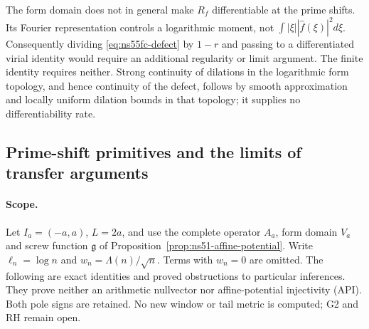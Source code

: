 \documentclass[11pt]{article}
\theoremstyle{remark}
\begin{document}
The form domain does not in general make $R_f$ differentiable at the
prime shifts. Its Fourier representation controls a logarithmic moment,
not $\int|\xi||\widehat f(\xi)|^2d\xi$. Consequently dividing
\eqref{eq:ns55fc-defect} by $1-r$ and passing to a differentiated
virial identity would require an additional regularity or limit
argument. The finite identity requires neither. Strong continuity of
dilations in the logarithmic form topology, and hence continuity of
the defect, follows by smooth approximation and locally uniform
dilation bounds in that topology; it supplies no differentiability rate.


\subsection*{Prime-shift primitives and the limits of transfer arguments}

\paragraph{Scope.}
Let $I_a=(-a,a)$, $L=2a$, and use the complete operator $A_a$,
form domain $V_a$ and screw function $\mathfrak g$ of
Proposition~\ref{prop:ns51-affine-potential}. Write
$\ell_n=\log n$ and $w_n=\Lambda(n)/\sqrt n$. Terms with
$w_n=0$ are omitted. The following are exact identities and proved
obstructions to particular inferences. They prove neither an arithmetic
nullvector nor affine-potential injectivity (API). Both pole signs are
retained. No new window or tail metric is computed; G2 and RH remain open.
\end{document}
